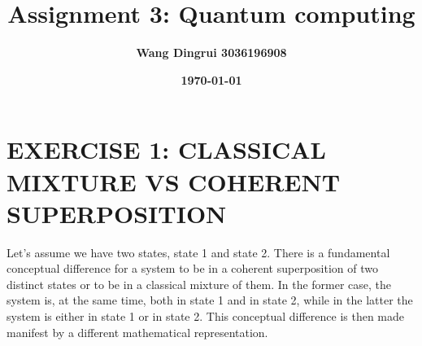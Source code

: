 \documentclass[12pt]{article}
\title{\textbf{Assignment 3: Quantum computing}}
\author{\textbf{Wang Dingrui 3036196908}}
\date{\textbf{\today}}
\begin{document}
\maketitle

\section{EXERCISE 1: CLASSICAL MIXTURE VS COHERENT SUPERPOSITION}
Let's assume we have two states, state 1 and state 2. There is a fundamental conceptual difference for a system to be in a coherent superposition of two distinct states or to be in a classical mixture of them. In the former case, the system is, at the same time, both in state 1 and in state 2, while in the latter the system is either in state 1 or in state 2. This conceptual difference is then made manifest by a different mathematical representation.
\end{document}
